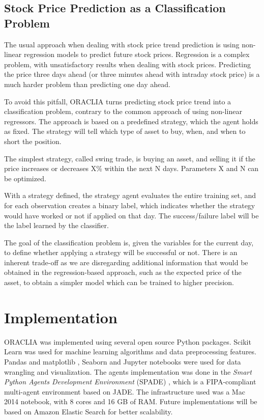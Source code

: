 \documentclass{aamas2017-extabs}
\begin{document}
\subsection{Stock Price Prediction as a Classification Problem}
\label{sec-proposed}

The usual approach when dealing with stock price trend prediction is using non-linear regression models to predict future stock prices. Regression is a complex problem, with unsatisfactory results when dealing with stock prices. Predicting the price three days ahead (or three minutes ahead with intraday stock price) is a much harder problem than predicting one day ahead.

To avoid this pitfall, ORACLIA turns predicting stock price trend into a classification problem, contrary to the common approach of using non-linear regressors. The approach is based on a predefined strategy, which the agent holds as fixed. The strategy will tell which type of asset to buy, when, and when to short the position.

The simplest strategy, called swing trade, is buying an asset, and selling it if the price increases or decreases X\% within the next N days. Parameters X and N can be optimized.

With a strategy defined, the strategy agent evaluates the entire training set, and for each observation creates a binary label, which indicates whether the strategy would have worked or not if applied on that day. The success/failure label will be the label learned by the classifier.

The goal of the classification problem is, given the variables for the current day, to define whether applying a strategy will be successful or not. There is an inherent trade-off as we are disregarding additional information that would be obtained in the regression-based approach, such as the expected price of the asset, to obtain a simpler model which can be trained to higher precision.

\section{Implementation}
\label{sec-implementation}

ORACLIA was implemented using several open source Python packages. Scikit Learn \cite{scikit-learn} was used for machine learning algorithms and data preprocessing features. Pandas \cite{mckinney2010data} and matplotlib \cite{hunter2007matplotlib}, Seaborn \cite{michael_waskom_2014_12710} and Jupyter notebooks \cite{perez2007ipython} were used for data wrangling and visualization. The agents implementation was done in the \emph{Smart Python Agents Development Environment} (SPADE) \cite{jabbur2014design}, which is a FIPA-compliant multi-agent environment based on JADE. The infrastructure used was a Mac 2014 notebook, with 8 cores and 16 GB of RAM. Future implementations will be based on Amazon Elastic Search for better scalability.
\end{document}
